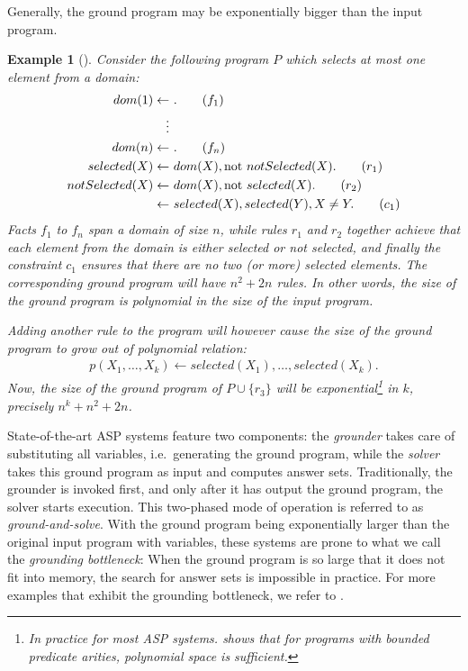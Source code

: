 \documentclass[final]{vutinfth} %
\newtheorem{example}{Example}[chapter]
\newcommand{\fail}{\mathrm{not } \ \xspace}
\newcommand{\from}{\ensuremath{\leftarrow}}
\begin{document}
Generally, the ground program may be exponentially bigger than the input program.

\newpage

\begin{example}[{\cite[Example 1]{alpha-techniques}}]
\label{ex:explosion}
Consider the following program $P$ which selects at most one element from a domain:
\begin{align}
dom(1) \from& \ .\tag{$f_1$} \\
\vdots \notag \\
dom(n) \from& \ . \tag{$f_n$} \\
selected(X) \from& \  dom(X), \fail notSelected(X).  \tag{$r_1$} \\
notSelected(X) \from& \  dom(X), \fail selected(X).  \tag{$r_2$} \\
\from& \ selected(X), selected(Y), X \not = Y.  \tag{$c_1$}
\end{align}
Facts $f_1$ to $f_n$ span a domain of size $n$, while rules $r_1$ and $r_2$ together achieve that each element from the domain is either selected or not selected, and finally the constraint $c_1$ ensures that there are no two (or more) selected elements. The corresponding ground program will have $n^2 + 2n$ rules. In other words, the size of the ground program is polynomial in the size of the input program.

Adding another rule to the program will however cause the size of the ground program to grow out of polynomial relation:
\begin{align}p(X_1, \ldots, X_k) \from selected(X_1), \ldots, selected(X_k). \tag{$r_3$} \end{align}
Now, the size of the ground program of $P \cup \{ r_3 \}$ will be exponential\footnote{In practice for most ASP systems. \cite{bounded-arities} shows that for programs with bounded predicate arities, polynomial space is sufficient.} in $k$, precisely $n^k + n^2 + 2n$.
\end{example}

State-of-the-art ASP systems feature two components: the \emph{grounder} takes care of substituting all variables, i.e.~generating the ground program, while the \emph{solver} takes this ground program as input and computes answer sets. Traditionally, the grounder is invoked first, and only after it has output the ground program, the solver starts execution. This two-phased mode of operation is referred to as \emph{ground-and-solve}. With the ground program being exponentially larger than the original input program with variables, these systems are prone to what we call the \emph{grounding bottleneck}: When the ground program is so large that it does not fit into memory, the search for answer sets is impossible in practice. For more examples that exhibit the grounding bottleneck, we refer to \cite[Section 1]{asperix}.
\end{document}
